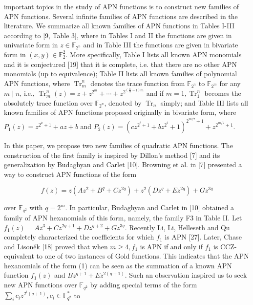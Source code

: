 \documentclass[10pt]{article}
\begin{document}
important topics in the study of APN functions is to construct new families of APN functions. Several infinite families of APN functions are described in the literature. We summarize all known families of APN functions in Tables I-III according to [9, Table 3], where in Tables I and II the functions are given in univariate form in $z \in \mathbb{F}_{2^{n}}$ and in Table III the functions are given in bivariate form in $(x, y) \in \mathbb{F}_{2}^{2}$. More specifically, Table I lists all known APN monomials and it is conjectured [19] that it is complete, i.e. that there are no other APN monomials (up to equivalence); Table II lists all known families of polynomial APN functions, where $\operatorname{Tr}_{m}^{n}$ denotes the trace function from $\mathbb{F}_{2^{n}}$ to $\mathbb{F}_{2^{m}}$ for any $m \mid n$, i.e., $\operatorname{Tr}_{m}^{n}(z)= z+z^{2^{m}}+\cdots+z^{2^{\left(\frac{n}{m}-1\right) m}}$ and if $m=1, \operatorname{Tr}_{1}^{n}$ becomes the absolutely trace function over $\mathbb{F}_{2^{n}}$, denoted by $\operatorname{Tr}_{n}$ simply; and Table III lists all known families of APN functions proposed originally in bivariate form, where $P_{1}(z)=z^{2^{k}+1}+a z+b$ and $P_{2}(z)=\left(c z^{2^{i}+1}+b z^{2^{i}}+1\right)^{2^{m / 2}+1}+z^{2^{m / 2}+1}$.

In this paper, we propose two new families of quadratic APN functions. The construction of the first family is inspired by Dillon's method [7] and its generalization by Budaghyan and Carlet [10]. Browning et al. in [7] presented a way to construct APN functions of the form


\begin{equation*}
f(z)=z\left(A z^{2}+B^{q}+C z^{2 q}\right)+z^{2}\left(D z^{q}+E z^{2 q}\right)+G z^{3 q} \tag{1}
\end{equation*}


over $\mathbb{F}_{q^{2}}$ with $q=2^{m}$. In particular, Budaghyan and Carlet in [10] obtained a family of APN hexanomials of this form, namely, the family F3 in Table II. Let $f_{1}(z)=A z^{3}+ C z^{2 q+1}+D z^{q+2}+G z^{3 q}$. Recently Li, Li, Helleseth and Qu completely characterized the coefficients for which $f_{1}$ is APN [27]. Later, Chase and Lisoněk [18] proved that when $m \geq 4, f_{1}$ is APN if and only if $f_{1}$ is CCZ-equivalent to one of two instances of Gold functions. This indicates that the APN hexanomials of the form (1) can be seen as the summation of a known APN function $f_{1}(z)$ and $B z^{q+1}+E z^{2(q+1)}$. Such an observation inspired us to seek new APN functions over $\mathbb{F}_{q^{2}}$ by adding special terms of the form $\sum_{i} c_{i} z^{2^{i}(q+1)}, c_{i} \in \mathbb{F}_{q^{2}}^{*}$ to
\end{document}
